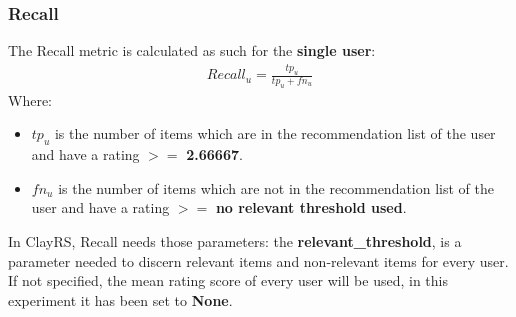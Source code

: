 \documentclass[11pt]{article}
\begin{document}
\subsubsection{Recall}\label{subsubsec:recall}
The Recall metric is calculated as such for the \textbf{single user}:
\hfill\break
\hfill\break
    \[
       \begin{gathered}
           Recall_u = \frac{tp_u}{tp_u + fn_u}
       \end{gathered}
    \]
\hfill\break
\hfill\break
    Where:
\begin{itemize}
    \item $tp_u$ is the number of items which are in the recommendation list of the user and have a
      rating $>=$         \textbf{2.66667}.
            \item $fn_u$ is the number of items which are not in the recommendation list of the user and have a
      rating $>=$         \textbf{no relevant threshold used}.
        \end{itemize}
\hfill\break
\hfill\break
In ClayRS, Recall needs those parameters:
the \textbf{relevant\_threshold}, is a parameter needed to discern relevant items and non-relevant items for every user.
If not specified, the mean rating score of every user will be used, in this experiment it has been set to
\textbf{None}.
\hfill\break
\hfill\break

\end{document}
